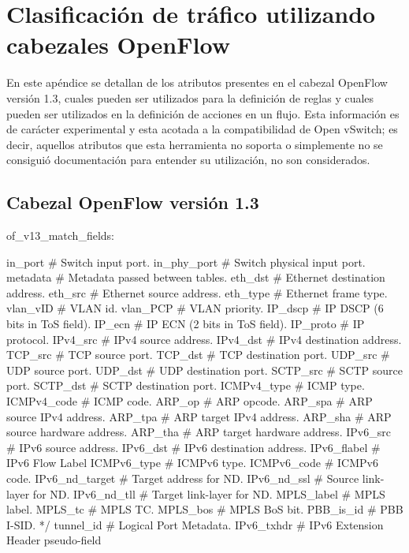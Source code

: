 
\chapter{Clasificaci\'on de tr\'afico utilizando cabezales OpenFlow}
\label{appendix3}

En este ap\'endice se detallan de los atributos presentes en el cabezal OpenFlow versi\'on 1.3, cuales pueden ser utilizados para la definici\'on de reglas y cuales pueden ser utilizados en la definici\'on de acciones en un flujo. Esta informaci\'on es de carácter experimental y esta acotada a la compatibilidad de Open vSwitch; es decir, aquellos atributos que esta herramienta no soporta o simplemente no se consiguió documentaci\'on para entender su utilizaci\'on, no son considerados.

\section{Cabezal OpenFlow versi\'on 1.3} 

\begin{python}
of_v13_match_fields:
      
	in_port			# Switch input port.
	in_phy_port 	# Switch physical input port. 
	metadata 		# Metadata passed between tables. 
	eth_dst 		# Ethernet destination address.
	eth_src 		# Ethernet source address. 
	eth_type 		# Ethernet frame type. 
	vlan_vID 		# VLAN id. 
	vlan_PCP		# VLAN priority. 
	IP_dscp 		# IP DSCP (6 bits in ToS field). 
	IP_ecn  		# IP ECN (2 bits in ToS field). 
	IP_proto		# IP protocol. 
	IPv4_src 		# IPv4 source address. 
	IPv4_dst 		# IPv4 destination address. 
	TCP_src 		# TCP source port. 
	TCP_dst 		# TCP destination port. 
	UDP_src 		# UDP source port. 
	UDP_dst 		# UDP destination port. 
	SCTP_src 		# SCTP source port. 
	SCTP_dst 		# SCTP destination port. 
	ICMPv4_type 	# ICMP type. 
	ICMPv4_code 	# ICMP code. 
	ARP_op			# ARP opcode. 
	ARP_spa 		# ARP source IPv4 address. 
	ARP_tpa 		# ARP target IPv4 address. 
	ARP_sha 		# ARP source hardware address. 
	ARP_tha 		# ARP target hardware address. 
	IPv6_src 		# IPv6 source address. 
	IPv6_dst 		# IPv6 destination address. 
	IPv6_flabel 	# IPv6 Flow Label 
	ICMPv6_type 	# ICMPv6 type. 
	ICMPv6_code 	# ICMPv6 code. 
	IPv6_nd_target 	# Target address for ND. 
	IPv6_nd_ssl 	# Source link-layer for ND. 
	IPv6_nd_tll  	# Target link-layer for ND. 
	MPLS_label 		# MPLS label. 
	MPLS_tc 		# MPLS TC. 
	MPLS_bos		# MPLS BoS bit. 
	PBB_is_id 		# PBB I-SID. */
	tunnel_id 		# Logical Port Metadata. 
	IPv6_txhdr 		# IPv6 Extension Header pseudo-field 
		
\end{python}

